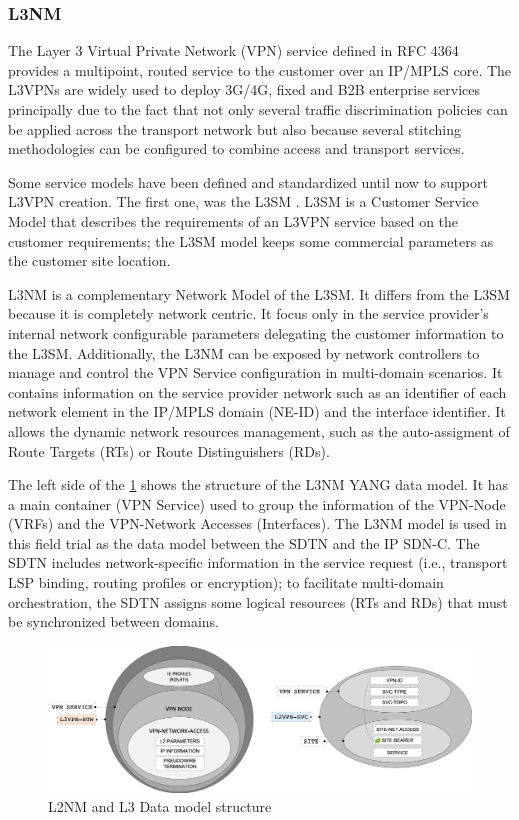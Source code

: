 \documentclass[a4paper,fleqn]{cas-dc}
\begin{document}
\subsubsection{L3NM}
\label{section:l3nm}
The Layer 3 Virtual Private Network (VPN) service defined in RFC 4364 \cite{rosen2006rfc} provides a multipoint, routed service to the customer over an IP/MPLS core. The L3VPNs are widely used to deploy 3G/4G, fixed and B2B enterprise services principally due to the fact that not only several traffic discrimination policies can be applied across the transport network but also because several stitching methodologies can be configured to combine access and transport services. 

Some service models have been defined and standardized until now to support L3VPN creation. The first one, was the L3SM \cite{rfc8299}. L3SM is a Customer Service Model that describes the requirements of an L3VPN service based on the customer requirements; the L3SM model keeps some commercial parameters as the customer site location.

L3NM \cite{voyer2019internet} is a complementary Network Model of the L3SM. It differs from the L3SM because it is completely network centric. It focus only in the service provider's internal network configurable parameters delegating the customer information to the L3SM. Additionally, the L3NM can be exposed by network controllers to manage and control the VPN Service configuration in multi-domain scenarios. It contains information on the service provider network such as an identifier of each network element in the IP/MPLS domain (NE-ID) and the interface identifier. It allows the dynamic network resources management, such as the auto-assigment of Route Targets (RTs) or Route Distinguishers (RDs).

The left side of the \cref{FIG:l3nm} shows the structure of the L3NM YANG data model. It has a  main container (VPN Service) used to group the information of the VPN-Node (VRFs) and the VPN-Network Accesses (Interfaces). The L3NM model is used in this field trial as the data model between the SDTN and the IP SDN-C. The SDTN includes network-specific information in the service request (i.e., transport LSP binding, routing profiles or encryption); to facilitate multi-domain orchestration, the SDTN assigns some logical resources (RTs and RDs) that must be synchronized between domains. 

\begin{figure}
	\centering
		\includegraphics[scale=0.35]{figs/L3NM_L2NM.png}
	\caption{L2NM and L3 Data model structure}
	\label{FIG:l3nm} 
\end{figure}
\end{document}
